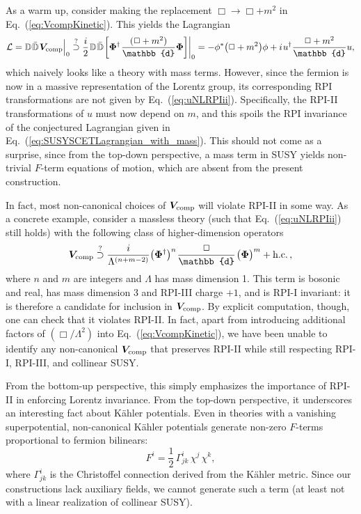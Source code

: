 \documentclass[12pt,document,nofootinbib,superscriptaddress,onecolumn,preprintnumbers,balancelastpage]{article}
\newcommand{\s}{\hspace{0.8pt}}
\newcommand{\PP}{\mathbb{d}}
\DeclareRobustCommand{\Eq}[1]{Eq.~(\ref{#1})}
\newcommand{\D}{\mathbb{D}}
\newcommand{\bPhi}{\boldsymbol{\Phi}}
\newcommand{\bV}{\boldsymbol{V}}
\begin{document}
\begin{spacing}{1.2}
As a warm up, consider making the replacement $\Box \to \Box + m^2$ in \Eq{eq:VcompKinetic}.
%
This yields the Lagrangian
%
\begin{align}
\label{eq:SUSYSCETLagrangian_with_mass}
\mathcal{L}  = \D\s \bar{\D}\s \bV_{\rm comp} \Big|_{0}  \stackrel{?}{\supset} \frac{i}{2}\s \D\s \bar{\D}\s \bigg[ \bPhi^\dagger\s \frac{(\Box+m^2)}{\PP}  \bPhi \bigg] \bigg|_{0} = -\phi^* \big(\Box + m^2\big) \phi + i\s u^\dag \frac{\Box+m^2}{\PP} u,
\end{align}
%
which naively looks like a theory with mass terms.
%
However, since the fermion is now in a massive representation of the Lorentz group, its corresponding RPI transformations are not given by \Eq{eq:uNLRPIii}.
%
Specifically, the RPI-II transformations of $u$ must now depend on $m$, and this spoils the RPI invariance of the conjectured Lagrangian given in \Eq{eq:SUSYSCETLagrangian_with_mass}.
%
This should not come as a surprise, since from the top-down perspective, a mass term in SUSY yields non-trivial $F$-term equations of motion, which are absent from the present construction.


In fact, most non-canonical choices of $\bV_{\rm comp}$ will violate RPI-II in some way.
%
As a concrete example, consider a massless theory (such that \Eq{eq:uNLRPIii} still holds) with the following class of higher-dimension operators
%
\begin{equation}
\bV_{\rm comp} \stackrel{?}{\supset} \frac{i}{\Lambda^{(n+m-2)}} \big(\bPhi^\dagger\big)^n \s\frac{ \Box}{\PP}\s \big(\bPhi\big)^m + \text{h.c.} \, ,
\end{equation}
%
where $n$ and $m$ are integers and $\Lambda$ has mass dimension 1.
%
This term is bosonic and real, has mass dimension 3 and RPI-III charge $+1$, and is RPI-I invariant: it is therefore a candidate for inclusion in $\bV_{\rm comp}$.
%
By explicit computation, though, one can check that it violates RPI-II.
%
In fact, apart from introducing additional factors of $(\Box/\Lambda^2)$ into \Eq{eq:VcompKinetic}, we have been unable to identify any non-canonical $\bV_{\rm comp}$ that preserves RPI-II while still respecting RPI-I, RPI-III, and collinear SUSY.


From the bottom-up perspective, this simply emphasizes the importance of RPI-II in enforcing Lorentz invariance.
%
From the top-down perspective, it underscores an interesting fact about K\"ahler potentials.
%
Even in theories with a vanishing superpotential, non-canonical K\"ahler potentials generate non-zero $F$-terms proportional to fermion bilinears:
%
\begin{equation}
F^i = \frac{1}{2}\, \Gamma^i_{jk}\, \chi^j\, \chi^k,
\end{equation}
%
where $\Gamma^i_{jk}$ is the Christoffel connection derived from the K\"ahler metric.
%
Since our constructions lack auxiliary fields, we cannot generate such a term (at least not with a linear realization of collinear SUSY).



\end{spacing}
\end{document}
